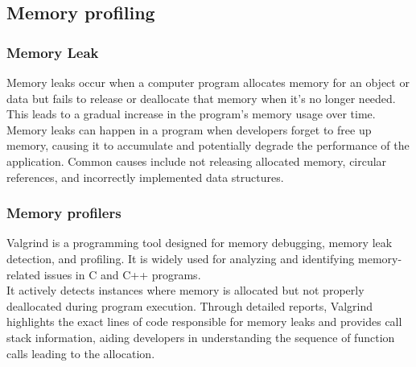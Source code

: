 \documentclass[titlepage]{article}
\begin{document}
\subsection{Memory profiling}
\subsubsection{Memory Leak}
Memory leaks occur when a computer program allocates memory for an object or data but fails to release or deallocate that memory when it's no longer needed. This leads to a gradual increase in the program's memory usage over time. Memory leaks can happen in a program when developers forget to free up memory, causing it to accumulate and potentially degrade the performance of the application. Common causes include not releasing allocated memory, circular references, and incorrectly implemented data structures.
\subsubsection{Memory profilers}
Valgrind is a programming tool designed for memory debugging, memory leak detection, and profiling. It is widely used for analyzing and identifying memory-related issues in C and C++ programs.\\
It actively detects instances where memory is allocated but not properly deallocated during program execution. Through detailed reports, Valgrind highlights the exact lines of code responsible for memory leaks and provides call stack information, aiding developers in understanding the sequence of function calls leading to the allocation.
\end{document}
